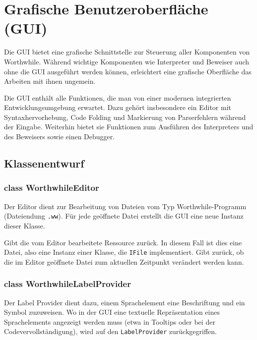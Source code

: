 \section{Grafische Benutzeroberfläche (GUI)}

Die GUI bietet eine grafische Schnittstelle zur Steuerung aller Komponenten von Worthwhile. Während wichtige Komponenten wie Interpreter und Beweiser auch ohne die GUI ausgeführt werden können, erleichtert eine grafische Oberfläche das Arbeiten mit ihnen ungemein.

Die GUI enthält alle Funktionen, die man von einer modernen integrierten Entwicklungsumgebung erwartet. Dazu gehört insbesondere ein Editor mit Syntaxhervorhebung, Code Folding und Markierung von Parserfehlern während der Eingabe. Weiterhin bietet sie Funktionen zum Ausführen des Interpreters und des Beweisers sowie einen Debugger.

\subsection{Klassenentwurf}

\subsubsection{class WorthwhileEditor}

Der Editor dient zur Bearbeitung von Dateien vom Typ Worthwhile-Programm (Dateiendung \texttt{.ww}). Für jede geöffnete Datei erstellt die GUI eine neue Instanz dieser Klasse.

\begin{description}
	 Gibt die vom Editor bearbeitete Ressource zurück. In diesem Fall ist dies eine Datei, also eine Instanz einer Klasse, die \texttt{IFile} implementiert.
	 Gibt zurück, ob die im Editor geöffnete Datei zum aktuellen Zeitpunkt verändert werden kann.
\end{description}

\subsubsection{class WorthwhileLabelProvider}

Der Label Provider dient dazu, einem Sprachelement eine Beschriftung und ein Symbol zuzuweisen. Wo in der GUI eine textuelle Repräsentation eines Sprachelements angezeigt werden muss (etwa in Tooltips oder bei der Codevervollständigung), wird auf den \texttt{LabelProvider} zurückgegriffen.

